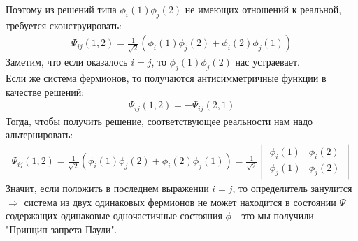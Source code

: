 \documentclass[__main__.tex]{subfiles}
\begin{document}
Поэтому из решений типа $\phi_i(1)\phi_j(2)$ не имеющих отношений к реальной, требуется сконструировать:\\
\begin{gather}
\Psi_{ij}(1,2)=\frac{1}{\sqrt{2}}(\phi_i(1)\phi_j(2)+\phi_i(2)\phi_j(1))
\end{gather}
Заметим, что если оказалось $i=j$, то $\phi_j(1)\phi_j(2)$ нас устраевает.\\
Если же система фермионов, то получаются антисимметричные функции в качестве решений:
\begin{gather}
\Psi_{ij}(1,2) = -\Psi_{ij}(2,1)
\end{gather}
Тогда, чтобы получить решение, соответствующее реальности нам надо альтернировать:\\
\begin{gather}
\Psi_{ij}(1,2)=\frac{1}{\sqrt{2}}(\phi_i(1)\phi_j(2)+\phi_i(2)\phi_j(1)) = \frac{1}{\sqrt{2}} \begin{vmatrix}
\phi_i(1) & \phi_i(2)\\
\phi_j(1) & \phi_j(2)
\end{vmatrix}
\end{gather}
Значит, если положить в последнем выражении $i=j$, то определитель занулится $\Longrightarrow$ система из двух одинаковых фермионов не может находится в состоянии $\Psi$ содержащих одинаковые одночастичные состояния $\phi$ - это мы получили "Принцип запрета Паули".
\end{document}
